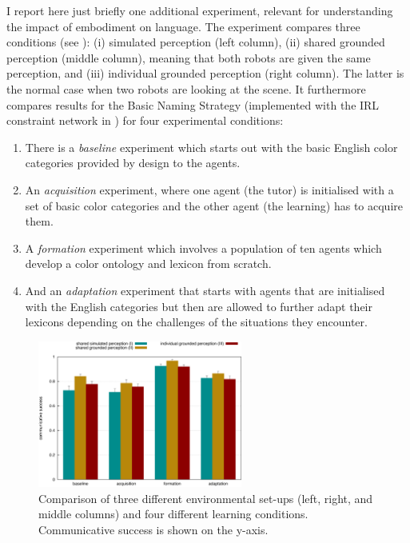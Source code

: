 I report here just briefly one additional experiment, relevant for understanding 
the impact of embodiment on language. The experiment compares three conditions (see ): 
(i) simulated perception (left column), (ii) shared grounded perception (middle column), meaning that both robots 
are given the same perception, and (iii) individual grounded 
perception (right column). The latter is the normal case when two robots are looking at the scene. 
It furthermore compares results for the Basic Naming Strategy (implemented with the IRL constraint network in 
) for four experimental conditions: 
\begin{enumerate}
\item There is a {\itshape baseline} experiment which starts out with the basic English color categories provided 
by design to the agents. 
\item An {\itshape acquisition} experiment, where one agent (the tutor) is initialised with a set of basic color categories and 
the other agent (the learning) has to acquire them. 
\item A {\itshape formation} experiment which involves a population of ten agents which develop a 
color ontology and lexicon from scratch. 
\item And an {\itshape adaptation} experiment that starts with agents that are initialised with the 
English categories but then are allowed to further adapt their lexicons depending on the challenges of the situations 
they encounter. 
\end{enumerate}
\begin{figure}[htbp]
  \centerline{\includegraphics[width=0.6\textwidth]{chap11/figs/grounding-comparison}}
\caption{ Comparison of three different environmental set-ups (left, right, and middle columns)
and four different learning conditions. Communicative success is shown on the y-axis.}
\label{fig:grounding-comparison} 
\end{figure}

